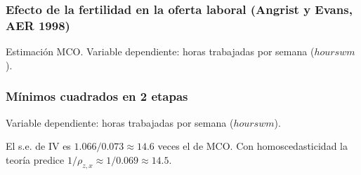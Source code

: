 \documentclass[t, compress, spanish, aspectratio=169]{beamer}
\begin{document}
\begin{frame}
	\frametitle{Efecto de la fertilidad en la oferta laboral (Angrist y Evans, AER 1998)}
	Estimaci\'on MCO. Variable dependiente: horas trabajadas por semana ($hourswm$).
	\begin{center}
	\footnotesize\renewcommand{\arraystretch}{0.9}
	
	\end{center}
\end{frame}
\begin{frame}
	\frametitle{M\'inimos cuadrados en 2 etapas}
	Variable dependiente: horas trabajadas por semana ($hourswm$).
	\begin{center}
	\footnotesize\renewcommand{\arraystretch}{0.9}
	
	\end{center}
	\small
	El s.e. de IV es $1.066/0.073\approx 14.6$ veces el de MCO. Con homoscedasticidad la teor\'ia predice $1/\rho_{z,x}\approx 1/0.069\approx 14.5$.
\end{frame}
%
%			
\end{document}
